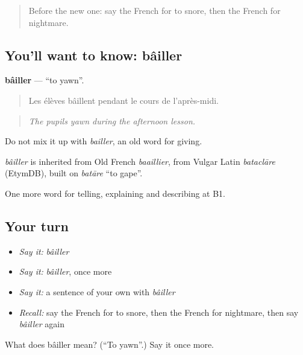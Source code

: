 \begin{quote}
Before the new one: say the French for to snore, then the French for nightmare.
\end{quote}

\subsection*{You'll want to know: bâiller}
\textbf{bâiller} — \textquotedblleft{}to yawn\textquotedblright{}.

\begin{quote}
Les élèves bâillent pendant le cours de l'après-midi.
\end{quote}

\begin{quote}
\emph{The pupils yawn during the afternoon lesson.}
\end{quote}

Do not mix it up with \emph{bailler}, an old word for giving.

\begin{cousinweb}
\emph{bâiller} is inherited from Old French \emph{baaillier}, from Vulgar Latin \emph{bataclāre} (EtymDB), built on \emph{batāre} \textquotedblleft{}to gape\textquotedblright{}.
\end{cousinweb}

\begin{grammarlens}[title={What you've built}]
One more word for telling, explaining and describing at B1.
\end{grammarlens}

\subsection*{Your turn}
\begin{itemize}
\raggedright
  \item \emph{Say it:} \emph{bâiller}
  \item \emph{Say it:} \emph{bâiller}, once more
  \item \emph{Say it:} a sentence of your own with \emph{bâiller}
  \item \emph{Recall:} say the French for to snore, then the French for nightmare, then say \emph{bâiller} again
\end{itemize}

\begin{tcolorbox}[breakable,colback=teal!4,colframe=teal!35!black,title={Before you move on}]
What does bâiller mean? (\textquotedblleft{}To yawn\textquotedblright{}.) Say it once more.
\end{tcolorbox}
